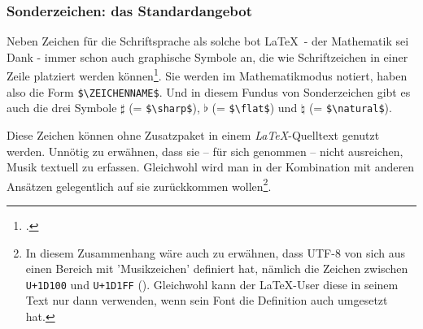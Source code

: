 %
%
%



\subsubsection{Sonderzeichen: das Standardangebot}

Neben Zeichen für die Schriftsprache als solche bot \LaTeX\ - der
Mathematik sei Dank - immer schon auch graphische Symbole an, die wie
Schriftzeichen in einer Zeile platziert werden können\footcite[vgl.][543ff et
passim]{MitGoo2005a}. Sie werden im Mathematikmodus notiert, haben also die Form
\texttt{\small \$\textbackslash{ZEICHENNAME}\$}. Und in diesem Fundus von Sonderzeichen
gibt es auch die drei Symbole $\sharp$ (= \texttt{\small \$\textbackslash{sharp}\$}),
$\flat$ (= \texttt{\small \$\textbackslash{flat}\$}) und $\natural$ (=
\texttt{\small \$\textbackslash{natural}\$}).

Diese Zeichen können ohne Zusatzpaket in einem \textit{LaTeX}-Quelltext genutzt
werden. Unnötig zu erwähnen, dass sie -- für sich genommen -- nicht ausreichen,
Musik textuell zu erfassen. Gleichwohl wird man in der Kombination mit anderen
Ansätzen gelegentlich auf sie zurückkommen wollen\footnote{In diesem
Zusammenhang wäre auch zu erwähnen, dass UTF-8 von sich aus einen Bereich mit
'Musikzeichen' definiert hat, nämlich die Zeichen zwischen \texttt{U+1D100} und
\texttt{U+1D1FF} (\cite[Vgl. dazu][\nopage wp.]{Koellerwirth2015a}). Gleichwohl
kann der \LaTeX-User diese in seinem Text nur dann verwenden, wenn sein Font
die Definition auch umgesetzt hat.}.

%
